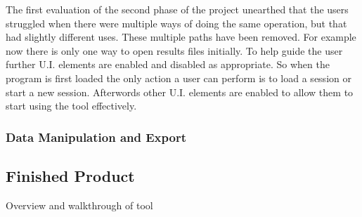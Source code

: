 The first evaluation of the second phase of the project unearthed that the users struggled when there were multiple ways of doing the same operation, but that had slightly different uses.  These multiple paths have been removed.  For example now there is only one way to open results files initially.  To help guide the user further U.I. elements are enabled and disabled as appropriate.  So when the program is first loaded the only action a user can perform is to load a session or start a new session.  Afterwords other U.I. elements are enabled to allow them to start using the tool effectively.

\subsubsection{Data Manipulation and Export}

\subsection{Finished Product}
Overview and walkthrough of tool
